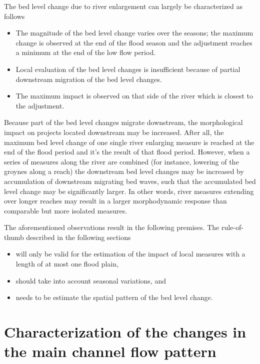 The bed level change due to river enlargement can largely be characterized as follows

\begin{itemize}
\item The magnitude of the bed level change varies over the seasons; the maximum change is observed at the end of the flood season and the adjustment reaches a minimum at the end of the low flow period.

\item Local evaluation of the bed level changes is insufficient because of partial downstream migration of the bed level changes.

\item The maximum impact is observed on that side of the river which is closest to the adjustment.
\end{itemize}

Because part of the bed level changes migrate downstream, the morphological impact on projects located downstream may be increased.
After all, the maximum bed level change of one single river enlarging measure is reached at the end of the flood period and it's the result of that flood period.
However, when a series of measures along the river are combined (for instance, lowering of the groynes along a reach) the downstream bed level changes may be increased by accumulation of downstream migrating bed waves, such that the accumulated bed level change may be significantly larger.
In other words, river measures extending over longer reaches may result in a larger morphodynamic response than comparable but more isolated measures.

The aforementioned observations result in the following premises.
The rule-of-thumb described in the following sections

\begin{itemize}
\item will only be valid for the estimation of the impact of local measures with a length of at most one flood plain,

\item should take into account seasonal variations, and

\item needs to be estimate the spatial pattern of the bed level change.
\end{itemize}


\section{Characterization of the changes in the main channel flow pattern}

